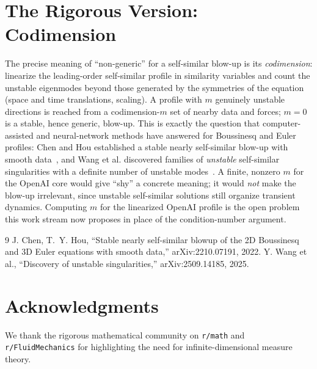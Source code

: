 \documentclass[11pt]{article}
\begin{document}
\section{The Rigorous Version: Codimension}
The precise meaning of ``non-generic'' for a self-similar blow-up is its \emph{codimension}: linearize the leading-order self-similar profile in similarity variables and count the unstable eigenmodes beyond those generated by the symmetries of the equation (space and time translations, scaling). A profile with $m$ genuinely unstable directions is reached from a codimension-$m$ set of nearby data and forces; $m = 0$ is a stable, hence generic, blow-up. This is exactly the question that computer-assisted and neural-network methods have answered for Boussinesq and Euler profiles: Chen and Hou established a stable nearly self-similar blow-up with smooth data~\cite{ChenHou2022}, and Wang et al. discovered families of \emph{unstable} self-similar singularities with a definite number of unstable modes~\cite{Wang2025}. A finite, nonzero $m$ for the OpenAI core would give ``shy'' a concrete meaning; it would \emph{not} make the blow-up irrelevant, since unstable self-similar solutions still organize transient dynamics. Computing $m$ for the linearized OpenAI profile is the open problem this work stream now proposes in place of the condition-number argument.

\begin{thebibliography}{9}
 J. Chen, T.~Y. Hou, ``Stable nearly self-similar blowup of the 2D Boussinesq and 3D Euler equations with smooth data,'' arXiv:2210.07191, 2022.
 Y. Wang et al., ``Discovery of unstable singularities,'' arXiv:2509.14185, 2025.
\end{thebibliography}

\section*{Acknowledgments}
We thank the rigorous mathematical community on \texttt{r/math} and \texttt{r/FluidMechanics} for highlighting the need for infinite-dimensional measure theory.
\end{document}
